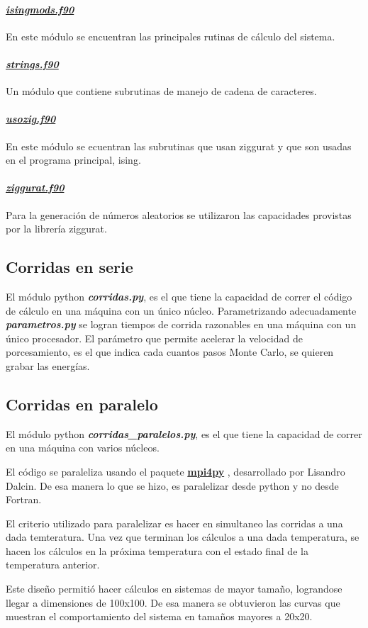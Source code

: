 \paragraph{\underline{\textit{isingmods.f90}}} 
En este m\'odulo  se encuentran las principales rutinas de c\'alculo del
sistema.


\paragraph{\underline{\textit{strings.f90}}}
Un m\'odulo que contiene subrutinas de manejo de cadena de caracteres.


\paragraph{\underline{\textit{usozig.f90}}} 
En este m\'odulo se ecuentran las subrutinas que usan ziggurat y que
son usadas en el programa principal, ising.
					
					
\paragraph{\underline{\textit{ziggurat.f90}}}

Para la generaci\'on de n\'umeros aleatorios se utilizaron
las capacidades provistas por la librer\'ia ziggurat. 


\subsection{Corridas en serie}\label{serie}
El módulo python \textbf{\textit{corridas.py}}, es el que tiene la capacidad de correr
el código de cálculo en una máquina con un único núcleo. Parametrizando adecuadamente
\textbf{\textit{parametros.py}} se logran tiempos de corrida razonables en una máquina
con un único procesador. El parámetro que permite acelerar la velocidad de porcesamiento, 
es el que indica cada cuantos pasos Monte Carlo, se quieren grabar las energías.

\subsection{Corridas en paralelo}\label{paralelo}

El módulo python \textbf{\textit{corridas\_paralelos.py}}, es el que tiene la capacidad de correr
en una máquina con varios núcleos.

El código se paraleliza usando el paquete \href{http://mpi4py.scipy.org/} {\textbf{mpi4py}} ,  desarrollado por Lisandro Dalcin.
De esa manera lo que se hizo, es paralelizar desde python y no desde Fortran.

El criterio utilizado para paralelizar es hacer en simultaneo  las corridas a una dada temteratura. 
Una vez que terminan los cálculos a una dada temperatura, se hacen los cálculos en la próxima
temperatura con el estado final de la temperatura anterior.

Este diseño permitió hacer cálculos en sistemas de mayor tamaño, lograndose llegar a dimensiones
de 100x100. De esa manera se obtuvieron las curvas que muestran el comportamiento del sistema en
tamaños mayores a 20x20.
